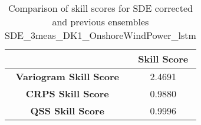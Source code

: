 
        \begin{table}[h!]
            \centering
            \begin{tabular}{|c|c|}
                \hline
                & \textbf{Skill Score}  \\
                \hline
                \textbf{Variogram Skill Score} & 2.4691  \\
                \hline
                \textbf{CRPS Skill Score} & 0.9880  \\
                \hline
                \textbf{QSS Skill Score} & 0.9996 \\
                \hline
            \end{tabular}
            \caption{Comparison of skill scores for SDE corrected and previous ensembles SDE_3meas_DK1_OnshoreWindPower_lstm}
            \label{table:skill_scores_comparison}
        \end{table}
        